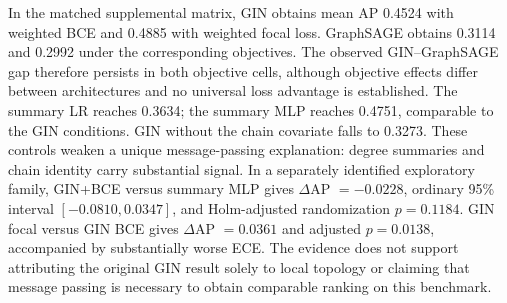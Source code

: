 In the matched supplemental matrix, GIN obtains mean AP 0.4524 with weighted BCE and 0.4885 with weighted focal loss. GraphSAGE obtains 0.3114 and 0.2992 under the corresponding objectives. The observed GIN--GraphSAGE gap therefore persists in both objective cells, although objective effects differ between architectures and no universal loss advantage is established. The summary LR reaches 0.3634; the summary MLP reaches 0.4751, comparable to the GIN conditions. GIN without the chain covariate falls to 0.3273. These controls weaken a unique message-passing explanation: degree summaries and chain identity carry substantial signal. In a separately identified exploratory family, GIN+BCE versus summary MLP gives $\Delta$AP $=-0.0228$, ordinary 95\% interval $[-0.0810,0.0347]$, and Holm-adjusted randomization $p=0.1184$. GIN focal versus GIN BCE gives $\Delta$AP $=0.0361$ and adjusted $p=0.0138$, accompanied by substantially worse ECE. The evidence does not support attributing the original GIN result solely to local topology or claiming that message passing is necessary to obtain comparable ranking on this benchmark.
